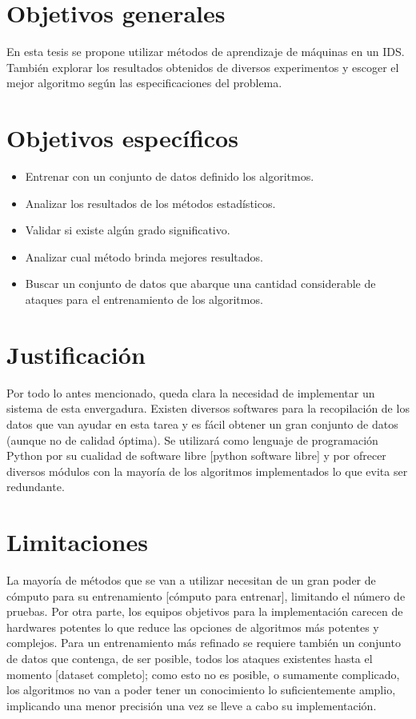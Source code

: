 \section*{Objetivos generales}
En esta tesis se propone utilizar métodos de aprendizaje de máquinas en un IDS. También explorar los resultados obtenidos de diversos experimentos y escoger el mejor algoritmo según las especificaciones del problema.

\section*{Objetivos específicos}
\begin{itemize}
    \item Entrenar con un conjunto de datos definido los algoritmos.
    \item Analizar los resultados de los métodos estadísticos.
    \item Validar si existe algún grado significativo.
    \item Analizar cual método brinda mejores resultados.
    \item Buscar un conjunto de datos que abarque una cantidad considerable de ataques para el entrenamiento de los algoritmos.
\end{itemize}

\section*{Justificación}
Por todo lo antes mencionado, queda clara la necesidad de implementar un sistema de esta envergadura. Existen diversos softwares para la recopilación de los datos que van ayudar en esta tarea y es fácil obtener un gran conjunto de datos (aunque no de calidad óptima). Se utilizará como lenguaje de programación Python por su cualidad de software libre [python software libre] y por ofrecer diversos módulos con la mayoría de los algoritmos implementados lo que evita ser redundante.

\section*{Limitaciones}
La mayoría de métodos que se van a utilizar necesitan de un gran poder de cómputo para su entrenamiento [cómputo para entrenar], limitando el número de pruebas. Por otra parte, los equipos objetivos para la implementación carecen de hardwares potentes lo que reduce las opciones de algoritmos más potentes y complejos. Para un entrenamiento más refinado se requiere también un conjunto de datos que contenga, de ser posible, todos los ataques existentes hasta el momento [dataset completo]; como esto no es posible, o sumamente complicado, los algoritmos no van a poder tener un conocimiento lo suficientemente amplio, implicando una menor precisión una vez se lleve a cabo su implementación.
